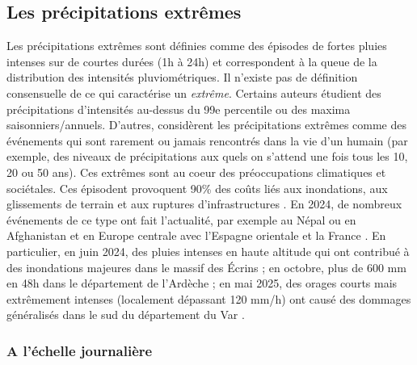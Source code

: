 \documentclass[
  article,
  nofooter,
  noheadings]{jss}
\begin{document}
\subsection{Les précipitations
extrêmes}\label{les-pruxe9cipitations-extruxeames}

Les précipitations extrêmes sont définies comme des épisodes de fortes
pluies intenses sur de courtes durées (1h à 24h) et correspondent à la
queue de la distribution des intensités pluviométriques. Il n'existe pas
de définition consensuelle de ce qui caractérise un \emph{extrême}.
Certains auteurs étudient des précipitations d'intensités au-dessus du
99e percentile ou des maxima saisonniers/annuels. D'autres, considèrent
les précipitations extrêmes comme des événements qui sont rarement ou
jamais rencontrés dans la vie d'un humain (par exemple, des niveaux de
précipitations aux quels on s'attend une fois tous les 10, 20 ou 50
ans). Ces extrêmes sont au coeur des préoccupations climatiques et
sociétales. Ces épisodent provoquent 90\% des coûts liés aux
inondations, aux glissements de terrain et aux ruptures
d'infrastructures \citep{IPCC_2022_WGIII}. En 2024, de nombreux
événements de ce type ont fait l'actualité, par exemple au Népal ou en
Afghanistan et en Europe centrale avec l'Espagne orientale et la France
\citep{WMO2025}. En particulier, en juin 2024, des pluies intenses en
haute altitude qui ont contribué à des inondations majeures dans le
massif des Écrins \citep{Blanc2024} ; en octobre, plus de 600 mm en 48h
dans le département de l'Ardèche
\citep{MeteoFrance2024_episodesArdeches} ; en mai 2025, des orages
courts mais extrêmement intenses (localement dépassant 120 mm/h) ont
causé des dommages généralisés dans le sud du département du Var
\citep{MeteoFrance2025}.

\subsubsection{A l'échelle
journalière}\label{a-luxe9chelle-journaliuxe8re}
\end{document}

